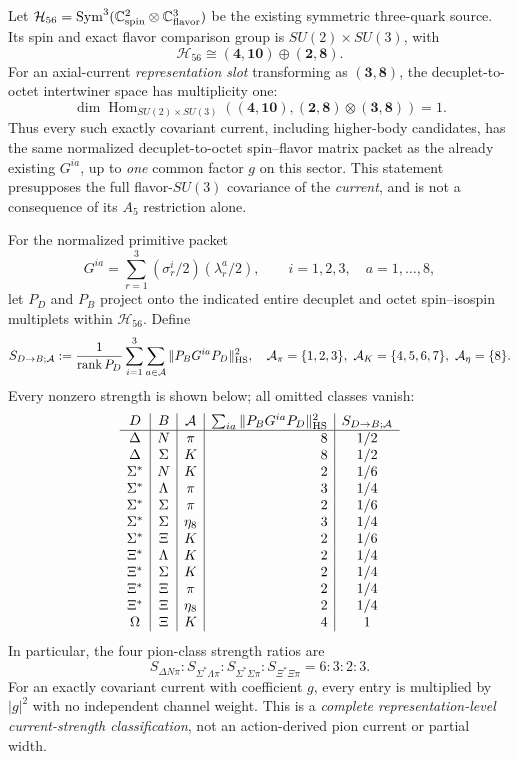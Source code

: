 \documentclass[12pt,a4paper]{article}
\begin{document}
\begin{theorem}
\label{p11:thm:v371-unique-decuplet-current-strengths}
Let $\mathcal H_{56}=\operatorname{Sym}^3(\mathbb C^2_{\rm spin}
\otimes\mathbb C^3_{\rm flavor})$ be the existing symmetric
three-quark source.  Its spin and exact flavor comparison group is
$SU(2)\times SU(3)$, with
\[
 \mathcal H_{56}\cong(\mathbf4,\mathbf{10})\oplus
 (\mathbf2,\mathbf8).
\]
For an axial-current \emph{representation slot} transforming as
$(\mathbf3,\mathbf8)$, the decuplet-to-octet intertwiner space has
multiplicity one:
\[
 \boxed{\dim\operatorname{Hom}_{SU(2)\times SU(3)}
 ((\mathbf4,\mathbf{10}),
 (\mathbf2,\mathbf8)\otimes(\mathbf3,\mathbf8))=1.}
\]
Thus every such exactly covariant current, including higher-body
candidates, has the same normalized decuplet-to-octet spin--flavor
matrix packet as the already existing $G^{ia}$, up to \emph{one}
common factor $g$ on this sector.  This statement presupposes the
full flavor-$SU(3)$ covariance of the \emph{current}, and is not a
consequence of its $A_5$ restriction alone.

For the normalized primitive packet
\[
 G^{ia}=\sum_{r=1}^3(\sigma^i_r/2)(\lambda^a_r/2),
 \qquad i=1,2,3,\quad a=1,\ldots,8,
\]
let $P_D$ and $P_B$ project onto the indicated entire decuplet and
octet spin--isospin multiplets within $\mathcal H_{56}$.  Define
\[
 S_{D\to B;\mathcal A}:=
 \frac1{\operatorname{rank}P_D}
 \sum_{i=1}^3\sum_{a\in\mathcal A}
 \|P_BG^{ia}P_D\|_{\rm HS}^2,
 \quad
 \mathcal A_\pi=\{1,2,3\},\ 
 \mathcal A_K=\{4,5,6,7\},\ 
 \mathcal A_\eta=\{8\}.
\]
Every nonzero strength is shown below; all omitted classes vanish:
\[
\begin{array}{c|c|c|r|c}
 D&B&\mathcal A&\sum_{ia}\|P_BG^{ia}P_D\|_{\rm HS}^2
             &S_{D\to B;\mathcal A}\\\hline
 \Delta&N&\pi&8&1/2\\
 \Delta&\Sigma&K&8&1/2\\
 \Sigma^*&N&K&2&1/6\\
 \Sigma^*&\Lambda&\pi&3&1/4\\
 \Sigma^*&\Sigma&\pi&2&1/6\\
 \Sigma^*&\Sigma&\eta_8&3&1/4\\
 \Sigma^*&\Xi&K&2&1/6\\
 \Xi^*&\Lambda&K&2&1/4\\
 \Xi^*&\Sigma&K&2&1/4\\
 \Xi^*&\Xi&\pi&2&1/4\\
 \Xi^*&\Xi&\eta_8&2&1/4\\
 \Omega&\Xi&K&4&1
\end{array}
\]
In particular, the four pion-class strength ratios are
\[
 \boxed{S_{\Delta N\pi}:S_{\Sigma^*\Lambda\pi}:
        S_{\Sigma^*\Sigma\pi}:S_{\Xi^*\Xi\pi}=6:3:2:3.}
\]
For an exactly covariant current with coefficient $g$, every entry
is multiplied by $|g|^2$ with no independent channel weight.
This is a \emph{complete representation-level current-strength
classification}, not an action-derived pion current or partial width.
\end{theorem}
\end{document}
